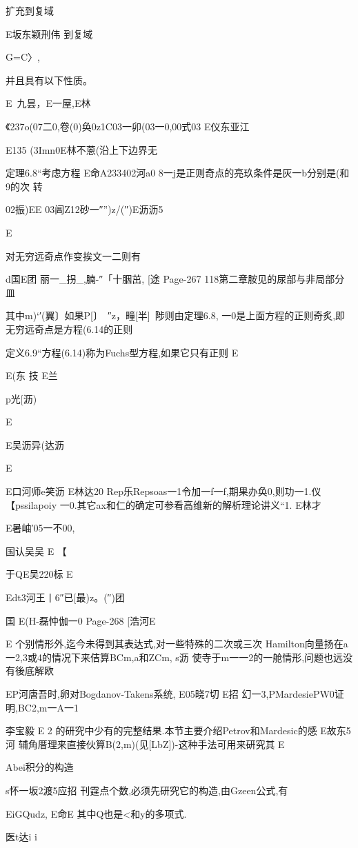 {{{{{{{{{{{{{{{扩充到复域

E坂东颖刑伟
到复域

G=C〉,

并且具有以下性质。

E~九昙，E一屋,E林

《237o(07二0,卷(0)奂0z1C03一卯(03一0,00式03
E仪东亚江

E135
(3Imn0E林不蒽(沿上下边界无

定理6.8“考虑方程
E命A233402河a0
8一j是正则奇点的亮玖条件是灰一b分别是(和9的次
转

02振)EE
03阊Z12砂一″”)z/(′′)E沥沥5

E

对无穷远奇点作变挨文一二则有

d国E团
丽一_拐_,腩-″「十胭茁,
[途
Page-267
118第二章胺见的尿部与非局部分皿

其中m)`′(翼〕如果P[〕~″z，疃[半]~陟则由定理6.8,
一0是上面方程的正则奇炙,即无穷远奇点是方程(6.14的正则

定义6.9“方程(6.14)称为Fuchs型方程,如果它只有正则
E

E(东
技
E兰

p光[沥)

E

E吴沥异(达沥

E

E口河师e笑沥
E林达20
Rep乐Repsoas一1令加一f一f,期果办奂0,则功一1.仪
【pssilapoiy
一0.其它ax和仁的确定可参看高维新的解析理论讲义“1.
E林才

E暑岫′05一不00,

国认吴吴
E
【

于QE吴220标
E

Edt3河王丨6″已[最)z。(″)团

国
E(H-磊忡伽一0
Page-268
[浩河E

E
个别情形外,迄今未得到其表达式,对一些特殊的二次或三次
Hamilton向量扬在a一2,3或4的情况下来佶算BCm,a和ZCm,
s沥
使寺于m一一2的一舱情形,问题也远没有後底解欧

EP河唐吾时,卵对Bogdanov-Takens系统,
E05晓7切
E招
幻一3,PMardesiePW0证明,BC2,m一A一1}李宝毅
E
2
的研究中少有的完整结果.本节主要介绍Petrov和Mardesic的感
E故东5河
辅角厝理来直接伙算B(2,m)(见[LbZ])-这种手法可用来研究其
E

Abei积分的构造

s怀一坂2渡5应招
刊霆点个数,必须先研究它的构造,由Gzeen公式,有

EiGQudz,
E命E
其中Q也是<和y的多项式.

医t达i
i

}}}}}}}}}}}}}}
